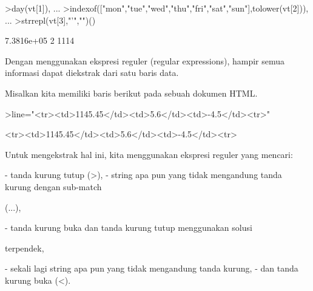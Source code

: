 \documentclass{article}
\newenvironment{eulernotebook}{\par}{\par}
\newenvironment{eulercomment}{\par\medskip}{\par\medskip}
\begin{document}
\begin{eulernotebook}
\begin{eulercomment}
\begin{eulercomment}
\begin{eulercomment}
\begin{eulercomment}
\begin{eulercomment}
\begin{eulercomment}
\begin{eulerprompt}
>day(vt[1]),  ...
>indexof(["mon","tue","wed","thu","fri","sat","sun"],tolower(vt[2])),  ...
>strrepl(vt[3],"'","")()
\end{eulerprompt}
\begin{euleroutput}
  7.3816e+05
  2
  1114
\end{euleroutput}
\begin{eulercomment}
Dengan menggunakan ekspresi reguler (regular expressions), hampir
semua informasi dapat diekstrak dari satu baris data.

Misalkan kita memiliki baris berikut pada sebuah dokumen HTML.
\end{eulercomment}
\begin{eulerprompt}
>line="<tr><td>1145.45</td><td>5.6</td><td>-4.5</td><tr>"
\end{eulerprompt}
\begin{euleroutput}
  <tr><td>1145.45</td><td>5.6</td><td>-4.5</td><tr>
\end{euleroutput}
\begin{eulercomment}
Untuk mengekstrak hal ini, kita menggunakan ekspresi reguler yang
mencari:

\end{eulercomment}
\begin{eulerttcomment}
 - tanda kurung tutup (>),
 - string apa pun yang tidak mengandung tanda kurung dengan sub-match
\end{eulerttcomment}
\begin{eulercomment}
(...),\\
\end{eulercomment}
\begin{eulerttcomment}
 - tanda kurung buka dan tanda kurung tutup menggunakan solusi
\end{eulerttcomment}
\begin{eulercomment}
terpendek,\\
\end{eulercomment}
\begin{eulerttcomment}
 - sekali lagi string apa pun yang tidak mengandung tanda kurung,
 - dan tanda kurung buka (<).
\end{eulerttcomment}
\begin{eulercomment}


\end{eulercomment}
\end{eulercomment}
\end{eulercomment}
\end{eulercomment}
\end{eulercomment}
\end{eulercomment}
\end{eulercomment}
\end{eulernotebook}
\end{document}
